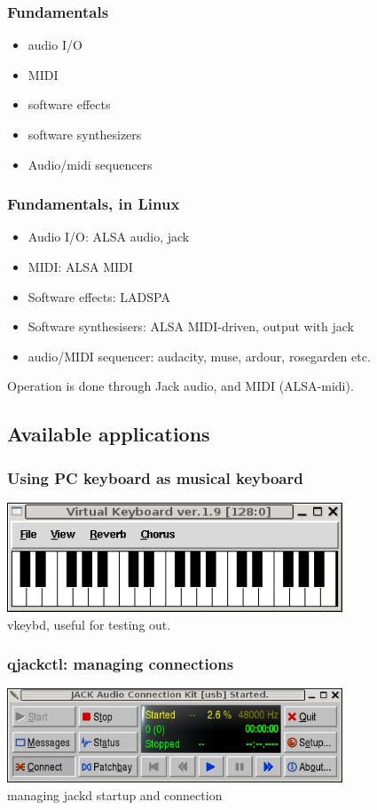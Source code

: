 \documentclass[dvipdfm]{beamer}
\begin{document}
\begin{frame}
\frametitle{Fundamentals}
 \begin{itemize}
  \item audio I/O
  \item MIDI
  \item software effects
  \item software synthesizers
  \item Audio/midi sequencers
 \end{itemize}
\end{frame}

\begin{frame}
\frametitle{Fundamentals, in Linux}
 \begin{itemize}
  \item Audio I/O: ALSA audio, jack
  \item MIDI: ALSA MIDI
  \item Software effects: LADSPA
  \item Software synthesisers: ALSA MIDI-driven, output with jack
  \item audio/MIDI sequencer: audacity, muse, ardour, rosegarden etc.
 \end{itemize}
 Operation is done through Jack audio, and MIDI  (ALSA-midi).
\end{frame}

 \subsection{Available applications}
\begin{frame}
 \frametitle{Using PC keyboard as musical keyboard}
\includegraphics[width=10cm]{image200602/vkeybd.png}\\
 vkeybd, useful for testing out.
\end{frame}

\begin{frame}
 \frametitle{qjackctl: managing connections}
\includegraphics[width=10cm]{image200602/qjackctl-1.png}\\
managing jackd startup and connection
\end{frame}
\end{document}
